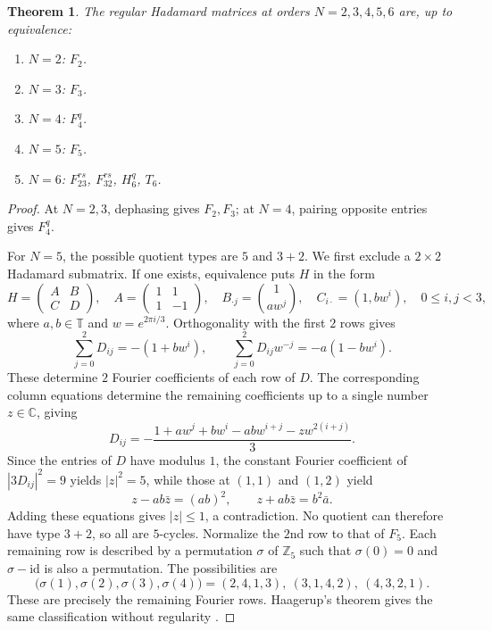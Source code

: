 \documentclass[11pt,a4paper]{article}
\newtheorem{theorem}{Theorem}[section]
\theoremstyle{plain}
\theoremstyle{definition}
\numberwithin{equation}{section}
\begin{document}
\begin{theorem}\label{bg:uptofive}\label{bg:ordersix}
The regular Hadamard matrices at orders $N=2,3,4,5,6$ are, up to equivalence:
\begin{enumerate}[label=(\arabic*)]
\item $N=2$: $F_2$.
\item $N=3$: $F_3$.
\item $N=4$: $F_4^q$.
\item $N=5$: $F_5$.
\item $N=6$: $F_{23}^{rs}$, $F_{32}^{rs}$, $H_6^q$, $T_6$.
\end{enumerate}
\end{theorem}
\begin{proof}
At $N=2,3$, dephasing gives $F_2,F_3$; at $N=4$, pairing opposite entries gives $F_4^q$.

For $N=5$, the possible quotient types are $5$ and $3+2$. We first exclude a $2\times2$ Hadamard submatrix. If one exists, equivalence puts $H$ in the form
$$H=\begin{pmatrix}A&B\\ C&D\end{pmatrix},\quad A=\begin{pmatrix}1&1\\1&-1\end{pmatrix},\quad B_{\cdot j}=\binom{1}{a w^j},\quad C_{i\cdot}=(1,bw^i),\quad 0\leq i,j<3,$$
where $a,b\in\mathbb T$ and $w=e^{2\pi i/3}$. Orthogonality with the first $2$ rows gives
$$\sum_{j=0}^2D_{ij}=-(1+bw^i),\qquad
\sum_{j=0}^2D_{ij}w^{-j}=-a(1-bw^i).$$
These determine $2$ Fourier coefficients of each row of $D$. The corresponding column equations determine the remaining coefficients up to a single number $z\in\mathbb C$, giving
$$D_{ij}=-\frac{1+a w^j+bw^i-abw^{i+j}-z w^{2(i+j)}}3.$$
Since the entries of $D$ have modulus $1$, the constant Fourier coefficient of $|3D_{ij}|^2=9$ yields $|z|^2=5$, while those at $(1,1)$ and $(1,2)$ yield
$$z-ab\bar{z}=(ab)^2,\qquad z+ab\bar{z}=b^2\bar{a}.$$
Adding these equations gives $|z|\leq1$, a contradiction. No quotient can therefore have type $3+2$, so all are $5$-cycles. Normalize the $2$nd row to that of $F_5$. Each remaining row is described by a permutation $\sigma$ of $\mathbb Z_5$ such that $\sigma(0)=0$ and $\sigma-\mathrm{id}$ is also a permutation. The possibilities are
$$\bigl(\sigma(1),\sigma(2),\sigma(3),\sigma(4)\bigr)=(2,4,1,3),\ (3,1,4,2),\ (4,3,2,1).$$
These are precisely the remaining Fourier rows. Haagerup's theorem gives the same classification without regularity \cite{ha1}.


\end{proof}
\end{document}
